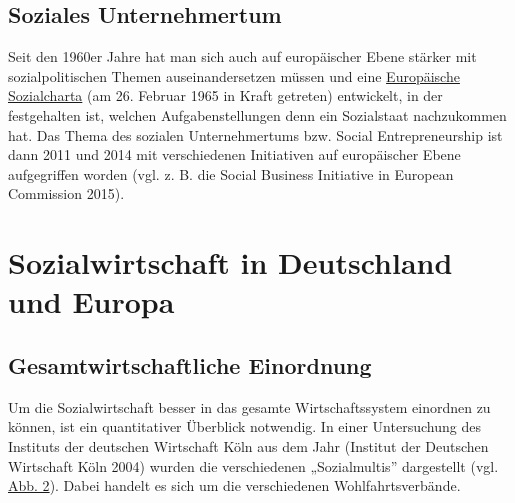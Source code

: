 \documentclass[
  letterpaper,
]{book}
\begin{document}
\section{Soziales Unternehmertum}\label{unternehmertum}

Seit den 1960er Jahre hat man sich auch auf europäischer Ebene stärker
mit sozialpolitischen Themen auseinandersetzen müssen und eine
\href{https://www.sozialcharta.eu/}{Europäische Sozialcharta} (am 26.
Februar 1965 in Kraft getreten) entwickelt, in der festgehalten ist,
welchen Aufgabenstellungen denn ein Sozialstaat nachzukommen hat. Das
Thema des sozialen Unternehmertums bzw. Social Entrepreneurship ist dann
2011 und 2014 mit verschiedenen Initiativen auf europäischer Ebene
aufgegriffen worden (vgl. z. B. die Social Business Initiative in
European Commission 2015).

\chapter{Sozialwirtschaft in Deutschland und Europa}\label{deutschland}

\section{Gesamtwirtschaftliche Einordnung}\label{gesamtwirtschaft}

Um die Sozialwirtschaft besser in das gesamte Wirtschaftssystem
einordnen zu können, ist ein quantitativer Überblick notwendig. In einer
Untersuchung des Instituts der deutschen Wirtschaft Köln aus dem Jahr
(Institut der Deutschen Wirtschaft Köln 2004) wurden die verschiedenen
„Sozialmultis'' dargestellt (vgl. \hyperref[figure2]{Abb. 2}). Dabei
handelt es sich um die verschiedenen Wohlfahrtsverbände.
\end{document}

